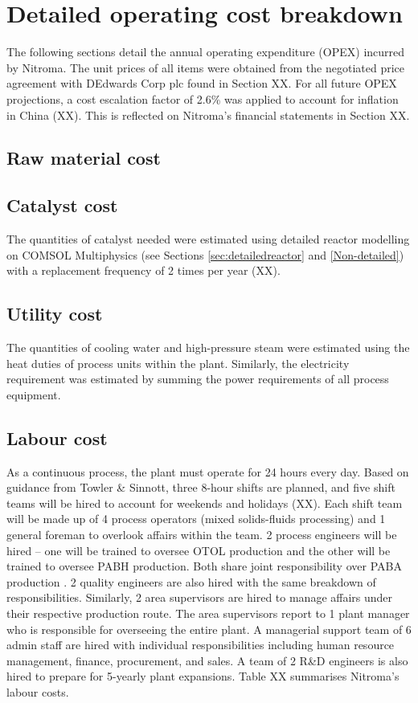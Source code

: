 \section{Detailed operating cost breakdown}
The following sections detail the annual operating expenditure (OPEX) incurred by Nitroma. The unit prices of all items were obtained from the negotiated price agreement with DEdwards Corp plc found in Section XX. For all future OPEX projections, a cost escalation factor of 2.6\% was applied to account for inflation in China (XX). This is reflected on Nitroma’s financial statements in Section XX.

\subsection{Raw material cost}
\label{sec:opex-raw-material}

\subsection{Catalyst cost}
 The quantities of catalyst needed were estimated using detailed reactor modelling on COMSOL Multiphysics (see Sections \ref{sec:detailedreactor} and \ref{Non-detailed}) with a replacement frequency of 2 times per year (XX).

\subsection{Utility cost}
 The quantities of cooling water and high-pressure steam were estimated using the heat duties of process units within the plant. Similarly, the electricity requirement was estimated by summing the power requirements of all process equipment.  

\subsection{Labour cost}
As a continuous process, the plant must operate for 24 hours every day. Based on guidance from Towler \& Sinnott, three 8-hour shifts are planned, and five shift teams will be hired to account for weekends and holidays (XX). Each shift team will be made up of 4 process operators (mixed solids-fluids processing) and 1 general foreman to overlook affairs within the team. 2 process engineers will be hired – one will be trained to oversee OTOL production and the other will be trained to oversee PABH production. Both share joint responsibility over PABA production . 2 quality engineers are also hired with the same breakdown of responsibilities.  Similarly, 2 area supervisors are hired to manage affairs under their respective production route. The area supervisors report to 1 plant manager who is responsible for overseeing the entire plant. A managerial support team of 6 admin staff are hired with individual responsibilities including human resource management, finance, procurement, and sales. A team of 2 R\&D engineers is also hired to prepare for 5-yearly plant expansions. Table XX summarises Nitroma's labour costs.

